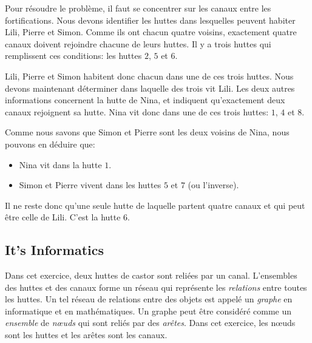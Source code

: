 \documentclass[a4paper,11pt]{report}
\newcommand{\taskGraphicsFolder}{..}
\begin{document}
{\centering%
\par}

Pour résoudre le problème, il faut se concentrer sur les canaux entre les fortifications. Nous devons identifier les huttes dans lesquelles peuvent habiter Lili, Pierre et Simon. Comme ils ont chacun quatre voisins, exactement quatre canaux doivent rejoindre chacune de leurs huttes. Il y a trois huttes qui remplissent ces conditions: les huttes $2$, $5$ et $6$.

{\centering%
\par}

Lili, Pierre et Simon habitent donc chacun dans une de ces trois huttes. Nous devons maintenant déterminer dans laquelle des trois vit Lili.
Les deux autres informations concernent la hutte de Nina, et indiquent qu’exactement deux canaux rejoignent sa hutte. Nina vit donc dans une de ces trois huttes: $1$, $4$ et $8$.

{\centering%
\par}

Comme nous savons que Simon et Pierre sont les deux voisins de Nina, nous pouvons en déduire que:

\begin{itemize}
  \item Nina vit dans la hutte $1$.
  \item Simon et Pierre vivent dans les huttes $5$ et $7$ (ou l’inverse).
\end{itemize}

Il ne reste donc qu’une seule hutte de laquelle partent quatre canaux et qui peut être celle de Lili. C’est la hutte $6$.


\subsection*{It’s Informatics}

Dans cet exercice, deux huttes de castor sont reliées par un canal. L’ensembles des huttes et des canaux forme un réseau qui représente les \emph{relations} entre toutes les huttes. Un tel réseau de relations entre des objets est appelé un \emph{graphe} en informatique et en mathématiques. Un graphe peut être considéré comme un \emph{ensemble} de \emph{nœuds} qui sont reliés par des \emph{arêtes}. Dans cet exercice, les nœuds sont les huttes et les arêtes sont les canaux.
\end{document}
